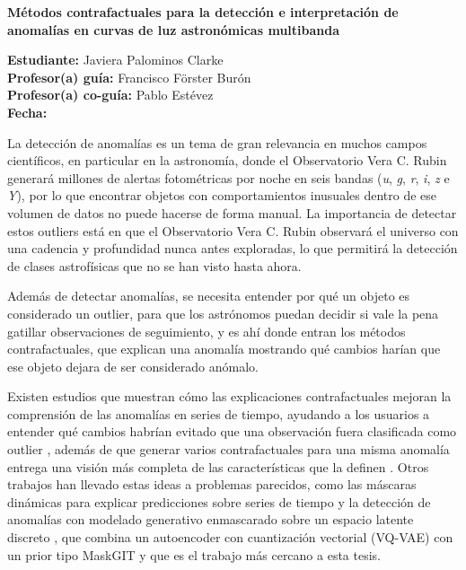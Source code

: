 \documentclass[11pt]{article}
\newcommand{\seccion}[1]{\vspace{6pt}\noindent{\large\textbf{$\bullet$ #1}}\par\vspace{2pt}}
\begin{document}
\begin{center}
{\Large\textbf{Métodos contrafactuales para la detección e interpretación de anomalías en curvas de luz astronómicas multibanda}}
\end{center}

\vspace{4pt}
\noindent
\textbf{Estudiante:} Javiera Palominos Clarke\\
\textbf{Profesor(a) guía:} Francisco Förster Burón\\
\textbf{Profesor(a) co-guía:} Pablo Estévez\\
\textbf{Fecha:}

\seccion{Antecedentes}

La detección de anomalías es un tema de gran relevancia en muchos campos científicos, en particular en la astronomía, donde el Observatorio Vera C. Rubin generará millones de alertas fotométricas por noche en seis bandas (\textit{u}, \textit{g}, \textit{r}, \textit{i}, \textit{z} e \textit{Y}), por lo que encontrar objetos con comportamientos inusuales dentro de ese volumen de datos no puede hacerse de forma manual. La importancia de detectar estos outliers está en que el Observatorio Vera C. Rubin observará el universo con una cadencia y profundidad nunca antes exploradas, lo que permitirá la detección de clases astrofísicas que no se han visto hasta ahora.

Además de detectar anomalías, se necesita entender por qué un objeto es considerado un outlier, para que los astrónomos puedan decidir si vale la pena gatillar observaciones de seguimiento, y es ahí donde entran los métodos contrafactuales, que explican una anomalía mostrando qué cambios harían que ese objeto dejara de ser considerado anómalo.

Existen estudios que muestran cómo las explicaciones contrafactuales mejoran la comprensión de las anomalías en series de tiempo, ayudando a los usuarios a entender qué cambios habrían evitado que una observación fuera clasificada como outlier \cite{cummins2024,schemmer2023}, además de que generar varios contrafactuales para una misma anomalía entrega una visión más completa de las características que la definen \cite{sulem2022}. Otros trabajos han llevado estas ideas a problemas parecidos, como las máscaras dinámicas para explicar predicciones sobre series de tiempo \cite{crabbe2021} y la detección de anomalías con modelado generativo enmascarado sobre un espacio latente discreto \cite{lee2024}, que combina un autoencoder con cuantización vectorial (VQ-VAE) \cite{vqvae2017} con un prior tipo MaskGIT \cite{maskgit2022} y que es el trabajo más cercano a esta tesis.
\end{document}
